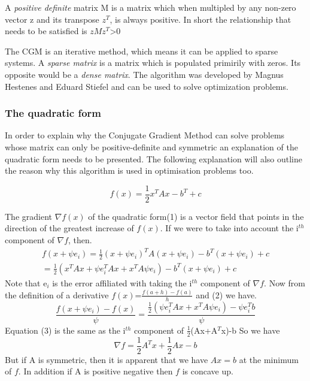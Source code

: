 \documentclass[12pt,a4paper]{article}
\begin{document}
A \emph{positive definite} matrix M is a matrix which when multipled by any non-zero vector z and its transpose $z^T$, is always positive. In short the relationship that needs to be satisfied is $zMz^T$>0

The CGM is an iterative method, which means it can be applied to sparse systems. A \emph{sparse matrix} is a matrix which is populated primirily with zeros. Its opposite would be a \emph{dense matrix}. The algorithm was developed by Magnus Hestenes and Eduard Stiefel and can be used to solve optimization problems\cite{press2007numerical}.
\subsubsection{The quadratic form}
In order to explain why the Conjugate Gradient Method can solve problems whose matrix can only be positive-definite and symmetric an explanation of the quadratic form needs to be presented. The following explanation will also outline the reason why this algorithm is used in optimisation problems too.
\begin{center}
\begin{equation}
f(x)=\frac{1}{2}x^TAx-b^T+c
\end{equation}
\end{center}

The gradient $\nabla f(x)$ of the quadratic form(1) is a vector field that points in the direction of the greatest increase of $f(x)$. If we were to take into account the i$^{th}$ component of $\nabla f$, then.
\begin{equation}
\begin{split}
f(x+\psi e_i)= \frac{1}{2} (x+\psi e_i)^TA(x+\psi e_i)-b^T(x+\psi e_i)+c\\
= \frac{1}{2} (x^TAx+\psi e^T_iAx +x^TA\psi e_i)-b^T(x+\psi e_i)+c
\end{split}
\end{equation}
Note that e$_i$ is the error affiliated with taking the i$^{th}$ component of $\nabla f$. Now from the definition of a derivative $f(x)$=$\frac{f(a+h)-f(a)}{h}$ and (2) we have.
\begin{equation}
\frac{f(x+\psi e_i)-f(x)}{\psi}=\frac{\frac{1}{2}(\psi e^T_iAx+x^TA\psi e_i)-\psi e^T_ib}{\psi}
\end{equation}
Equation (3) is the same as the i$^{th}$ component of $\frac{1}{2}$(Ax+A$^T$x)-b
So we have
\begin{equation}
\nabla f =\frac{1}{2}A^Tx+\frac{1}{2}Ax-b
\end{equation}
But if A is symmetric, then it is apparent that we have $Ax=b$ at the minimum of $f$. In addition if A is positive negative then $f$ is concave up. 
\end{document}

